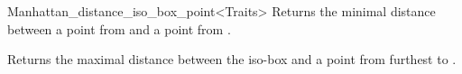 \begin{ccRefClass}{Manhattan_distance_iso_box_point<Traits>}
{Returns the minimal distance between a point from  and a point from
.}

{Returns the maximal distance between the iso-box  and
a point from  furthest to .}


\ccSeeAlso





\end{ccRefClass}


